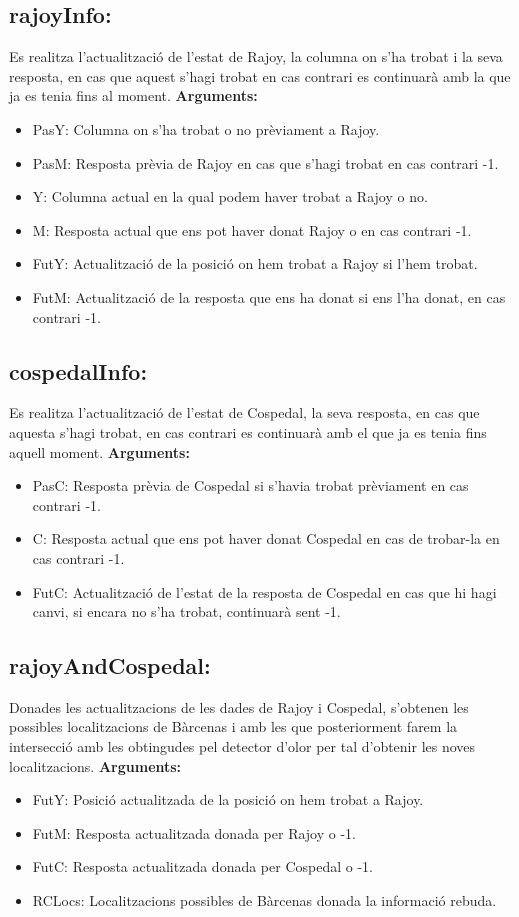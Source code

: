 \documentclass[11pt]{article}
\begin{document}
\subsection{rajoyInfo:}
Es realitza l'actualització de l'estat de Rajoy, la columna on s'ha trobat i la seva resposta, en cas que aquest s'hagi trobat en cas contrari es continuarà amb la que ja es tenia fins al moment.
\textbf{Arguments:}
\begin{itemize}
\item PasY: Columna on s'ha trobat o no prèviament a Rajoy.
\item PasM: Resposta prèvia de Rajoy en cas que s'hagi trobat en cas contrari -1.
\item Y: Columna actual en la qual podem haver trobat a Rajoy o no.
\item M: Resposta actual que ens pot haver donat Rajoy o en cas contrari -1.
\item FutY: Actualització de la posició on hem trobat a Rajoy si l'hem trobat.
\item FutM: Actualització de la resposta que ens ha donat si ens l'ha donat, en cas contrari -1.
\end{itemize}
\subsection{cospedalInfo:}
Es realitza l'actualització de l'estat de Cospedal, la seva resposta, en cas que aquesta s'hagi trobat, en cas contrari es continuarà amb el que ja es tenia fins aquell moment.
\textbf{Arguments:}
\begin{itemize}
\item PasC: Resposta prèvia de Cospedal si s'havia trobat prèviament en cas contrari -1.
\item C: Resposta actual que ens pot haver donat Cospedal en cas de trobar-la en cas contrari -1.
\item FutC: Actualització de l'estat de la resposta de Cospedal en cas que hi hagi canvi, si encara no s'ha trobat, continuarà sent -1.
\end{itemize}

\subsection{rajoyAndCospedal:}
Donades les actualitzacions de les dades de Rajoy i Cospedal, s'obtenen les possibles localitzacions de Bàrcenas i amb les que posteriorment farem la intersecció amb les obtingudes pel detector d'olor per tal d'obtenir les noves localitzacions.
\textbf{Arguments:}
\begin{itemize}
\item FutY: Posició actualitzada de la posició on hem trobat a Rajoy.
\item FutM: Resposta actualitzada donada per Rajoy o -1.
\item FutC: Resposta actualitzada donada per Cospedal o -1.
\item RCLocs: Localitzacions possibles de Bàrcenas donada la informació rebuda.
\end{itemize}
\end{document}

